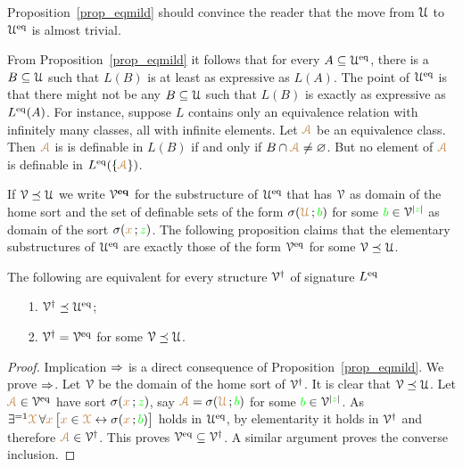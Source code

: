 \documentclass[creche.tex]{subfiles}
\begin{document}
Proposition~\ref{prop_eqmild} should convince the reader that the move from $\EuScript U$ to $\EuScript U^{{\rm eq}}$ is almost trivial. %


\begin{remark}\label{rem_eqmild}
From Proposition~\ref{prop_eqmild} it follows that for every $A\subseteq\EuScript U^{{\rm eq}}$, there is a $B\subseteq\EuScript U$ such that $L(B)$ is at least as expressive as $L(A)$. The point of $\EuScript U^{{\rm eq}}$ is that there might not be any $B\subseteq\EuScript U$ such that $L(B)$ is exactly as expressive as $L^{{\rm eq}}(A)$. For instance, suppose $L$ contains only an equivalence relation with infinitely many classes, all with infinite elements. Let ${\color{brown}\EuScript A}$ be an equivalence class. Then ${\color{brown}\EuScript A}$ is is definable in $L(B)$ if and only if $B\cap {\color{brown}\EuScript A}\neq\varnothing$. But no element of ${\color{brown}\EuScript A}$ is definable in $L^{{\rm eq}}(\{{\color{brown}\EuScript A}\})$.\QED
\end{remark}

If $\EuScript V\preceq\EuScript U$ we write \emph{$\EuScript V^{\textbf{eq}}$\/} for the substructure of $\EuScript U^{{\rm eq}}$ that has $\EuScript V$ as domain of the home sort and  the set of definable sets of the form $\sigma({\color{brown}\EuScript U}\,;{\color{green} b})$ for some ${\color{green} b}\in \EuScript V^{|{\color{green} z}|}$ as domain of the sort $\sigma({\color{brown} x}\,;{\color{green} z})$. 
The following proposition claims that the elementary substructures of $\EuScript U^{{\rm eq}}$ are exactly those of the form $\EuScript V^{{\rm eq}}$ for some $\EuScript V\preceq\EuScript U$. 

\begin{proposition}
The following are equivalent for every structure $\EuScript V^\dag$ of signature $L^{{\rm eq}}$
\begin{itemize}
\item[1.] $\EuScript V^\dag\preceq\EuScript U^{{\rm eq}}$;
\item[2.] $\EuScript V^\dag=\EuScript V^{{\rm eq}}$ for some $\EuScript V\preceq\EuScript U$.
\end{itemize}
\end{proposition}
\begin{proof}
Implication $\Rightarrow$ is a direct consequence of Proposition~\ref{prop_eqmild}. We prove $\Rightarrow$. Let $\EuScript V$ be the domain of the home sort of $\EuScript V^\dag$. It is clear that $\EuScript V\preceq\EuScript U$. Let ${\color{brown}\EuScript A}\in\EuScript V^{{\rm eq}}$  have sort $\sigma({\color{brown} x}\,;{\color{green} z})$, say ${\color{brown}\EuScript A}=\sigma({\color{brown}\EuScript U}\,;{\color{green} b})$ for some ${\color{green} b}\in\EuScript V^{|{\color{green} z}|}$. As $\exists^{=1}{\color{brown}\EuScript X}\, \forall{\color{brown}x}\,\big[{\color{brown} x}\in{\color{brown}\EuScript X}\leftrightarrow\sigma({\color{brown} x}\,;{\color{green} b})\big]$ holds in $\EuScript U^{{\rm eq}}$, by elementarity it holds in $\EuScript V^\dag$ and therefore ${\color{brown}\EuScript A}\in\EuScript V^\dag$. This proves $\EuScript V^{{\rm eq}}\subseteq\EuScript V^\dag$. A similar argument proves the converse inclusion.
\end{proof}
\end{document}
